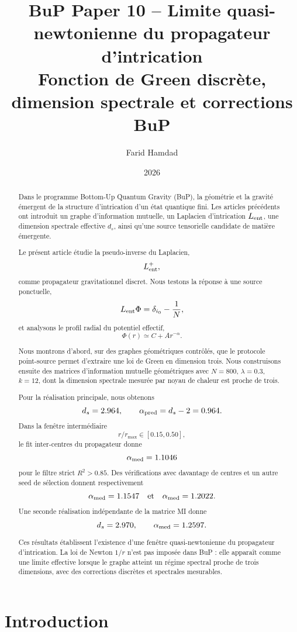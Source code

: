 \documentclass[11pt,a4paper]{article}
\title{
\textbf{BuP Paper 10 -- Limite quasi-newtonienne du propagateur d'intrication}\\
\large Fonction de Green discrète, dimension spectrale et corrections BuP
}
\author{Farid Hamdad}
\date{2026}
\begin{document}
\maketitle

\begin{abstract}
Dans le programme Bottom-Up Quantum Gravity (BuP), la géométrie et la gravité
émergent de la structure d'intrication d'un état quantique fini. Les articles
précédents ont introduit un graphe d'information mutuelle, un Laplacien
d'intrication \(L_{\rm ent}\), une dimension spectrale effective \(d_s\), ainsi
qu'une source tensorielle candidate de matière émergente.

Le présent article étudie la pseudo-inverse du Laplacien,
\[
L_{\rm ent}^{+},
\]
comme propagateur gravitationnel discret. Nous testons la réponse à une source
ponctuelle,
\[
L_{\rm ent}\Phi
=
\delta_{i_0}
-
\frac{1}{N},
\]
et analysons le profil radial du potentiel effectif,
\[
\Phi(r)
\simeq
C
+
A r^{-\alpha}.
\]

Nous montrons d'abord, sur des graphes géométriques contrôlés, que le protocole
point-source permet d'extraire une loi de Green en dimension trois. Nous
construisons ensuite des matrices d'information mutuelle géométriques avec
\(N=800\), \(\lambda=0.3\), \(k=12\), dont la dimension spectrale mesurée par
noyau de chaleur est proche de trois.

Pour la réalisation principale, nous obtenons
\[
d_s=2.964,
\qquad
\alpha_{\rm pred}=d_s-2=0.964.
\]
Dans la fenêtre intermédiaire
\[
r/r_{\max}\in[0.15,0.50],
\]
le fit inter-centres du propagateur donne
\[
\alpha_{\rm med}=1.1046
\]
pour le filtre strict \(R^2>0.85\). Des vérifications avec davantage de centres
et un autre seed de sélection donnent respectivement
\[
\alpha_{\rm med}=1.1547
\quad \text{et} \quad
\alpha_{\rm med}=1.2022.
\]
Une seconde réalisation indépendante de la matrice MI donne
\[
d_s=2.970,
\qquad
\alpha_{\rm med}=1.2597.
\]

Ces résultats établissent l'existence d'une fenêtre quasi-newtonienne du
propagateur d'intrication. La loi de Newton \(1/r\) n'est pas imposée dans BuP :
elle apparaît comme une limite effective lorsque le graphe atteint un régime
spectral proche de trois dimensions, avec des corrections discrètes et
spectrales mesurables.
\end{abstract}

\tableofcontents

\section{Introduction}
\end{document}
